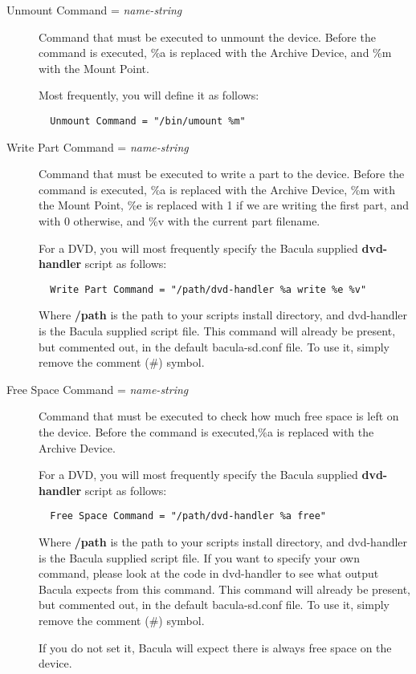 \begin{description}
\item [Unmount Command = {\it name-string}]
   Command that must be executed to unmount the device. Before the command  is
   executed, \%a is replaced with the Archive Device, and \%m with the  Mount
   Point.

   Most frequently, you will define it as follows:  

\footnotesize
\begin{verbatim}
  Unmount Command = "/bin/umount %m"
\end{verbatim}
\normalsize

\item [Write Part Command = {\it name-string}]
   Command that must be executed to write a part to the device. Before the 
   command is executed, \%a is replaced with the Archive Device, \%m with the 
   Mount Point, \%e is replaced with 1 if we are writing the first part,
   and with 0 otherwise, and \%v with the current part filename.

   For a DVD, you will most frequently specify the Bacula supplied  {\bf
   dvd-handler} script as follows:  

\footnotesize
\begin{verbatim}
  Write Part Command = "/path/dvd-handler %a write %e %v"
\end{verbatim}
\normalsize

  Where {\bf /path} is the path to your scripts install directory, and
  dvd-handler is the Bacula supplied script file.  
  This command will already be present, but commented out,
  in the default bacula-sd.conf file. To use it, simply remove
  the comment (\#) symbol.


\item [Free Space Command = {\it name-string}]
   Command that must be executed to check how much free space is left on the 
   device. Before the command is executed,\%a is replaced with the Archive
   Device.

   For a DVD, you will most frequently specify the Bacula supplied  {\bf
   dvd-handler} script as follows:  

\footnotesize
\begin{verbatim}
  Free Space Command = "/path/dvd-handler %a free"
\end{verbatim}
\normalsize

  Where {\bf /path} is the path to your scripts install directory, and
  dvd-handler is the Bacula supplied script file.
  If you want to specify your own command, please look at the code in
  dvd-handler to see what output Bacula expects from this command.
  This command will already be present, but commented out,
  in the default bacula-sd.conf file. To use it, simply remove
  the comment (\#) symbol.

  If you do not set it, Bacula will expect there is always free space on the
  device. 

\end{description}

